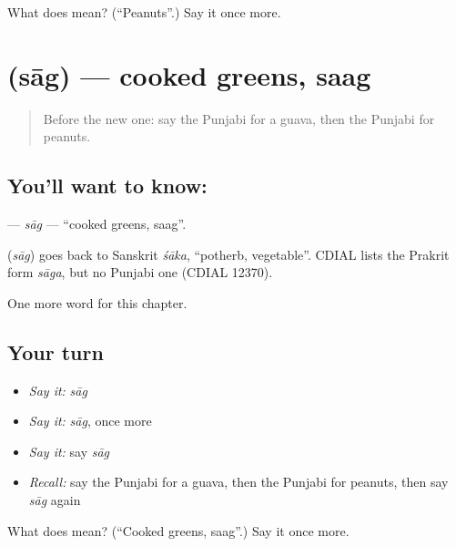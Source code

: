 \begin{tcolorbox}[breakable,colback=teal!4,colframe=teal!35!black,title={Before you move on}]
What does  mean? (\textquotedblleft{}Peanuts\textquotedblright{}.) Say it once more.
\end{tcolorbox}
\section[\texorpdfstring{\pa{ਸਾਗ} (sāg)}{ਸਾਗ (sāg)}]{ (sāg) — cooked greens, saag}

\label{lesson:PA-C124-sag}



\begin{quote}
Before the new one: say the Punjabi for a guava, then the Punjabi for peanuts.
\end{quote}

\subsection*{You'll want to know: }
\textbf{} — \emph{sāg} — \textquotedblleft{}cooked greens, saag\textquotedblright{}.

\begin{cousinweb}
\textbf{} (\emph{sāg}) goes back to Sanskrit \emph{śāka}, \textquotedblleft{}potherb, vegetable\textquotedblright{}. CDIAL lists the Prakrit form \emph{sāga}, but no Punjabi one (CDIAL 12370).
\end{cousinweb}

\begin{grammarlens}[title={What you've built}]
One more word for this chapter.
\end{grammarlens}

\subsection*{Your turn}
\begin{itemize}
\raggedright
  \item \emph{Say it:} \emph{sāg}
  \item \emph{Say it:} \emph{sāg}, once more
  \item \emph{Say it:} say \emph{sāg}
  \item \emph{Recall:} say the Punjabi for a guava, then the Punjabi for peanuts, then say \emph{sāg} again
\end{itemize}

\begin{tcolorbox}[breakable,colback=teal!4,colframe=teal!35!black,title={Before you move on}]
What does  mean? (\textquotedblleft{}Cooked greens, saag\textquotedblright{}.) Say it once more.
\end{tcolorbox}
